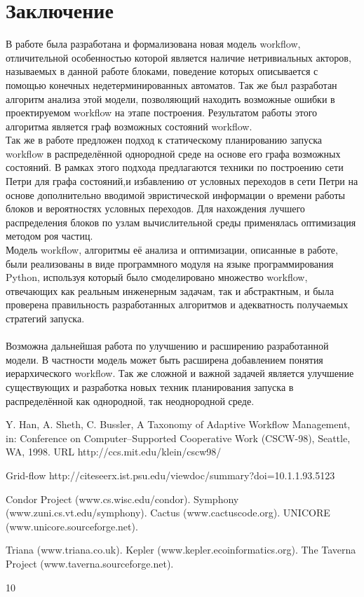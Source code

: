 \documentclass[a4paper,12pt]{article}
\begin{document}
\section{Заключение}
В работе была разработана и формализована новая модель workflow, отличительной особенностью которой является наличие нетривиальных акторов, называемых в данной работе блоками, поведение которых описывается с помощью конечных недетерминированных автоматов. Так же был разработан алгоритм анализа этой модели, позволяющий находить возможные ошибки в проектируемом workflow на этапе построения. Результатом работы этого алгоритма является граф возможных состояний workflow.\\
   Так же в работе предложен подход к статическому планированию запуска workflow в распределённой однородной среде на основе его графа возможных состояний. В рамках этого подхода предлагаются техники по построению сети Петри для графа состояний,и избавлению от условных переходов в сети Петри на основе дополнительно вводимой эвристической информации о времени работы блоков и вероятностях условных переходов. Для нахождения лучшего распределения блоков по узлам вычислительной среды применялась оптимизация методом роя частиц.\\
       Модель workflow, алгоритмы её анализа и оптимизации, описанные в работе, были реализованы в виде программного модуля на языке программирования Python, используя который было смоделировано множество workflow, отвечающих как реальным инженерным задачам, так и абстрактным, и была проверена правильность разработанных алгоритмов и адекватность получаемых стратегий запуска.\\\\
Возможна дальнейшая работа по улучшению и расширению разработанной модели. В частности модель может быть расширена добавлением понятия  иерархического workflow. Так же сложной и важной задачей является улучшение существующих  
и разработка новых техник планирования запуска в распределённой как однородной, так неоднородной среде.

\newpage
\begin{thebibliography}{10}
 Y. Han, A. Sheth, C. Bussler, A Taxonomy of Adaptive Workflow Management, in:
Conference on Computer–Supported Cooperative Work (CSCW-98), Seattle, WA,
1998.
URL http://ccs.mit.edu/klein/cscw98/


Grid-flow http://citeseerx.ist.psu.edu/viewdoc/summary?doi=10.1.1.93.5123

 Condor Project (www.cs.wisc.edu/condor).
 Symphony (www.zuni.cs.vt.edu/symphony).
 Cactus (www.cactuscode.org).
 UNICORE (www.unicore.sourceforge.net).


 Triana (www.triana.co.uk).
 Kepler (www.kepler.ecoinformatics.org).
 The Taverna Project (www.taverna.sourceforge.net).



\end{thebibliography}{10}
\end{document}
